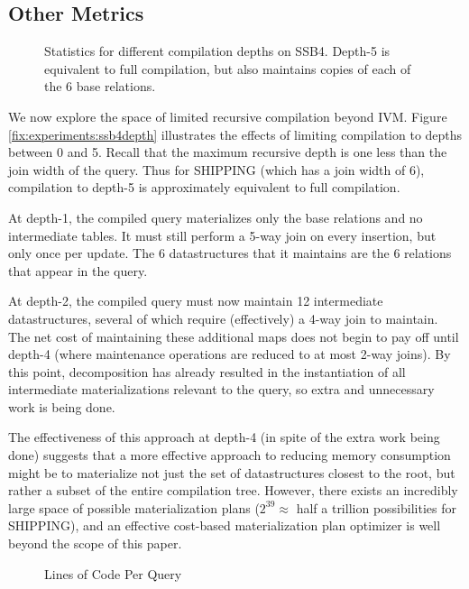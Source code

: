 \subsection{Other Metrics}
\label{sec:experiments:othermetrics}

\begin{figure}
\begin{center}

\caption{Statistics for different compilation depths on SSB4.  Depth-5 is equivalent to full compilation, but also maintains copies of each of the 6 base relations.}
\end{center}
\end{figure}

We now explore the space of limited recursive compilation beyond IVM.  Figure \ref{fix:experiments:ssb4depth} illustrates the effects of limiting compilation to depths between 0 and 5.  Recall that the maximum recursive depth is one less than the join width of the query.  Thus for SHIPPING (which has a join width of 6), compilation to depth-5 is approximately equivalent to full compilation.

At depth-1, the compiled query materializes only the base relations and no intermediate tables.  It must still perform a 5-way join on every insertion, but  only once per update.  The 6 datastructures that it maintains are the 6 relations that appear in the query.  

At depth-2, the compiled query must now maintain 12 intermediate datastructures, several of which require (effectively) a 4-way join to maintain.  The net cost of maintaining these additional maps does not begin to pay off until depth-4 (where maintenance operations are reduced to at most 2-way joins).  By this point, decomposition has already resulted in the instantiation of all intermediate materializations relevant to the query, so extra and unnecessary work is being done.  

The effectiveness of this approach at depth-4 (in spite of the extra work being done) suggests that a more effective approach to reducing memory consumption might be to materialize not just the set of datastructures closest to the root, but rather a subset of the entire compilation tree.  However, there exists an incredibly large space of possible materialization plans ($2^{39} \approx $ half a trillion possibilities for SHIPPING), and an effective cost-based materialization plan optimizer is well beyond the scope of this paper.


\begin{figure}
\begin{center}

\caption{Lines of Code Per Query}
\label{fig:experiments:loc}
\end{center}
\end{figure}




